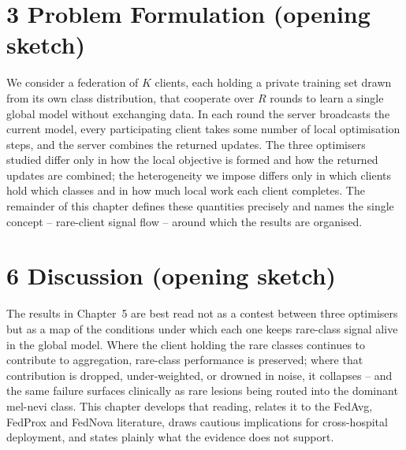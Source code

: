 \section*{3 Problem Formulation (opening sketch)}
We consider a federation of $K$ clients, each holding a private training set
drawn from its own class distribution, that cooperate over $R$ rounds to learn a
single global model without exchanging data. In each round the server broadcasts
the current model, every participating client takes some number of local
optimisation steps, and the server combines the returned updates. The three
optimisers studied differ only in how the local objective is formed and how the
returned updates are combined; the heterogeneity we impose differs only in which
clients hold which classes and in how much local work each client completes. The
remainder of this chapter defines these quantities precisely and names the single
concept -- rare-client signal flow -- around which the results are organised.


\section*{6 Discussion (opening sketch)}
The results in Chapter~5 are best read not as a contest between three optimisers
but as a map of the conditions under which each one keeps rare-class signal alive
in the global model. Where the client holding the rare classes continues to
contribute to aggregation, rare-class performance is preserved; where that
contribution is dropped, under-weighted, or drowned in noise, it collapses --
and the same failure surfaces clinically as rare lesions being routed into the
dominant mel-nevi class. This chapter develops that reading, relates it to the
FedAvg, FedProx and FedNova literature, draws cautious implications for
cross-hospital deployment, and states plainly what the evidence does not support.


